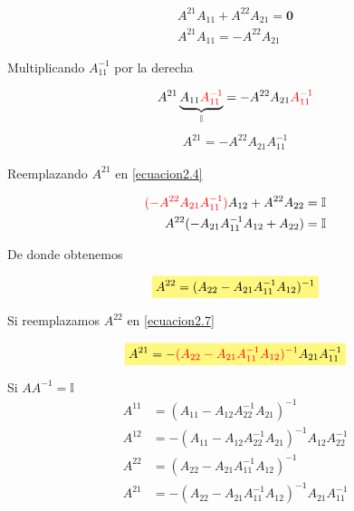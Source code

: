 \documentclass[12pt]{article}
\newcommand{\highlight}[2][yellow]{\mathchoice%
  {\colorbox{#1}{$\displaystyle#2$}}%
  {\colorbox{#1}{$\textstyle#2$}}%
  {\colorbox{#1}{$\scriptstyle#2$}}%
  {\colorbox{#1}{$\scriptscriptstyle#2$}}}%
\begin{document}
\begin{align*}
    A^{21} A_{11} + A^{22} A_{21} = \textbf{0} \\
    A^{21} A_{11} = - A^{22} A_{21}
\end{align*}

Multiplicando \color{red} $A_{11}^{-1}$ \color{black} por la derecha

\begin{align*}
    A^{21} \underbrace{ A_{11} \color{red} A_{11}^{-1} \color{black}}_{\mathbb{I}} = - A^{22} A_{21} \color{red} A_{11}^{-1} \color{black}
\end{align*}
\begin{align} \label{ecuacion2.7}
    A^{21} = - A^{22} A_{21} A_{11}^{-1}
\end{align}

Reemplazando \color{red} $A^{21}$ \color{black} en \eqref{ecuacion2.4}

\begin{align*}
    \color{red} (- A^{22} A_{21} A_{11}^{-1}) \color{black} A_{12} +  A^{22} A_{22} = \mathbb{I}\\
    A^{22} (- A_{21} A_{11}^{-1} A_{12} + A_{22}) = \mathbb{I}
\end{align*}

De donde obtenemos 

\begin{equation}\label{ecuacion2.8}
    \highlight[yellow!50!white]{ A^{22} = (A_{22} - A_{21} A_{11}^{-1} A_{12})^{-1} }
\end{equation}

Si reemplazamos \color{red} $A^{22}$ \color{black} en \eqref{ecuacion2.7}

\begin{align*} 
    \highlight[yellow!50!white]{ A^{21} = -\color{red} (A_{22} - A_{21} A_{11}^{-1} A_{12} )^{-1} \color{black}  A_{21} A_{11}^{-1} }
\end{align*}



\begin{center}
\begin{tcolorbox}[colback=blue!10!white ,colframe=white,width=11 cm]
\large \sffamily Si $AA^{-1} = \mathbb{I}$
\begin{align*}
    A^{11} &= (A_{11} - A_{12}A_{22}^{-1}A_{21})^{-1} \\
    A^{12} &= -(A_{11} - A_{12}A_{22}^{-1}A_{21})^{-1} A_{12} A_{22}^{-1}\\
    A^{22} &= (A_{22} - A_{21} A_{11}^{-1} A_{12})^{-1} \\
    A^{21} &= - (A_{22} - A_{21} A_{11}^{-1} A_{12})^{-1} A_{21} A_{11}^{-1} 
\end{align*}
\end{tcolorbox}
\end{center}
\end{document}
